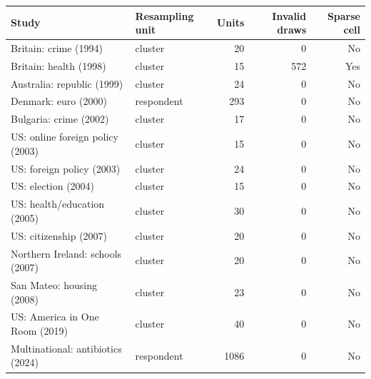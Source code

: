 \begin{tabular}{llrrr}
\toprule
Study & Resampling unit & Units & Invalid draws & Sparse cell \\
\midrule
Britain: crime (1994) & cluster & 20 & 0 & No \\
Britain: health (1998) & cluster & 15 & 572 & Yes \\
Australia: republic (1999) & cluster & 24 & 0 & No \\
Denmark: euro (2000) & respondent & 293 & 0 & No \\
Bulgaria: crime (2002) & cluster & 17 & 0 & No \\
US: online foreign policy (2003) & cluster & 15 & 0 & No \\
US: foreign policy (2003) & cluster & 24 & 0 & No \\
US: election (2004) & cluster & 15 & 0 & No \\
US: health/education (2005) & cluster & 30 & 0 & No \\
US: citizenship (2007) & cluster & 20 & 0 & No \\
Northern Ireland: schools (2007) & cluster & 20 & 0 & No \\
San Mateo: housing (2008) & cluster & 23 & 0 & No \\
US: America in One Room (2019) & cluster & 40 & 0 & No \\
Multinational: antibiotics (2024) & respondent & 1086 & 0 & No \\
\bottomrule
\end{tabular}
